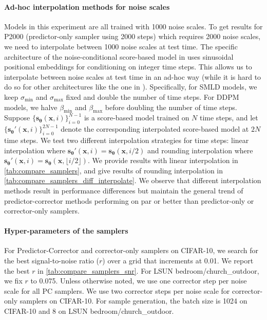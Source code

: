 \documentclass{article} %
\newcommand{\bfx}{\mathbf{x}}
\newcommand{\bftheta}{{\boldsymbol{\theta}}}
\newcommand{\bfs}{\mathbf{s}}
\newcommand{\sm}{\sigma_{\text{min}}}
\newcommand{\sM}{\sigma_{\text{max}}}
\newcommand{\betam}{\beta_{\text{min}}}
\newcommand{\betaM}{\beta_{\text{max}}}
\begin{document}
\paragraph{Ad-hoc interpolation methods for noise scales} 
Models in this experiment are all trained with 1000 noise scales. To get results for P2000 (predictor-only sampler using 2000 steps) which requires 2000 noise scales, we need to interpolate between 1000 noise scales at test time. The specific architecture of the noise-conditional score-based model in \citet{ho2020denoising} uses sinusoidal positional embeddings for conditioning on integer time steps. This allows us to interpolate between noise scales at test time in an ad-hoc way (while it is hard to do so for other architectures like the one in \citet{song2019generative}). Specifically, for SMLD models, we keep $\sm$ and $\sM$ fixed and double the number of time steps. For DDPM models, we halve $\betam$ and $\betaM$ before doubling the number of time steps. Suppose $\{\bfs_\bftheta(\bfx, i)\}_{i=0}^{N-1}$ is a score-based model trained on $N$ time steps, and let $\{\bfs_\bftheta'(\bfx, i)\}_{i=0}^{2N-1}$ denote the corresponding interpolated score-based model at $2N$ time steps. We test two different interpolation strategies for time steps: linear interpolation where $\bfs_\bftheta'(\bfx, i) = \bfs_\bftheta(\bfx, i / 2)$ and rounding interpolation where $\bfs_\bftheta'(\bfx, i) = \bfs_\bftheta(\bfx, \lfloor i/2 \rfloor)$. We provide results with linear interpolation in \cref{tab:compare_samplers}, and give results of rounding interpolation in \cref{tab:compare_samplers_diff_interpolate}. We observe that different interpolation methods result in performance differences but maintain the general trend of predictor-corrector methods performing on par or better than predictor-only or corrector-only samplers.

\paragraph{Hyper-parameters of the samplers}
For Predictor-Corrector and corrector-only samplers on CIFAR-10, we search for the best signal-to-noise ratio ($r$) over a grid that increments at 0.01. We report the best $r$ in \cref{tab:compare_samplers_snr}. For LSUN bedroom/church\_outdoor, we fix $r$ to 0.075. Unless otherwise noted, we use one corrector step per noise scale for all PC samplers. We use two corrector steps per noise scale for corrector-only samplers on CIFAR-10. For sample generation, the batch size is 1024 on CIFAR-10 and 8 on LSUN bedroom/church\_outdoor. 
\end{document}
